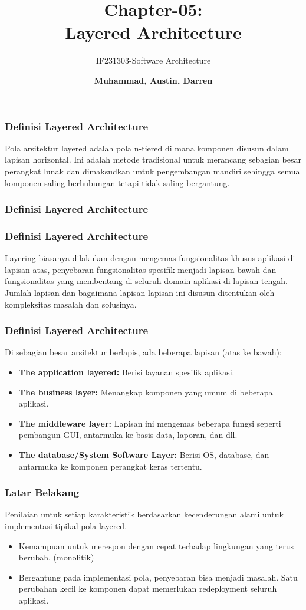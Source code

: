 \documentclass[aspectratio=169, table]{beamer}
\subtitle{IF231303-Software Architecture}
\title{\Large Chapter-05:\\Layered Architecture}
\author[Pradita]{\small {\textbf{Muhammad, Austin, Darren}}}
\begin{document}
	\frame{\titlepage}

	\begin{frame}
		\frametitle{Definisi Layered Architecture}
		Pola arsitektur layered adalah pola n-tiered di mana komponen disusun dalam lapisan horizontal. Ini adalah metode tradisional untuk merancang sebagian besar perangkat lunak dan dimaksudkan untuk pengembangan mandiri sehingga semua komponen saling berhubungan tetapi tidak saling bergantung.
	\end{frame}

	\begin{frame}
		\frametitle{Definisi Layered Architecture}
	\end{frame}

	\begin{frame}
		\frametitle{Definisi Layered Architecture}
		Layering biasanya dilakukan dengan mengemas fungsionalitas khusus aplikasi di lapisan atas, penyebaran fungsionalitas spesifik menjadi lapisan bawah dan fungsionalitas yang membentang di seluruh domain aplikasi di lapisan tengah. Jumlah lapisan dan bagaimana lapisan-lapisan ini disusun ditentukan oleh kompleksitas masalah dan solusinya.
	\end{frame}

	\begin{frame}
		\frametitle{Definisi Layered Architecture}
		Di sebagian besar arsitektur berlapis, ada beberapa lapisan (atas ke bawah):
		\begin{itemize}
			\item \textbf{The application layered:} Berisi layanan spesifik aplikasi.
			\item \textbf{The business layer:} Menangkap komponen yang umum di beberapa aplikasi.
			\item \textbf{The middleware layer:} Lapisan ini mengemas beberapa fungsi seperti pembangun GUI, antarmuka ke basis data, laporan, dan dll.
			\item \textbf{The database/System Software Layer:} Berisi OS, database, dan antarmuka ke komponen perangkat keras tertentu.
		\end{itemize}
	\end{frame}

	\begin{frame}
		\frametitle{Latar Belakang}
		Penilaian untuk setiap karakteristik berdasarkan kecenderungan alami untuk implementasi tipikal pola layered.
		\begin{itemize}
			\item Kemampuan untuk merespon dengan cepat terhadap lingkungan yang terus berubah. (monolitik)
			\item Bergantung pada implementasi pola, penyebaran bisa menjadi masalah. Satu perubahan kecil ke komponen dapat memerlukan redeployment seluruh aplikasi.

		\end{itemize}
	\end{frame}
\end{document}

